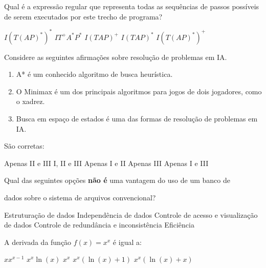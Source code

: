 \documentclass[12pt, addpoints]{exam}
\begin{document}
\begin{questions}
Qual é a expressão regular que representa todas as sequências de passos possíveis de serem executados por este trecho de programa?
\begin{choices}
\choice \( I(T(AP)^*)^* \)
\choice \( IT^+A^*P^* \)
\choice \( I(TAP)^+ \)
\choice \( I(TAP)^* \)
\choice \( I(T(AP)^*)^+ \)
\end{choices}

\question

Considere as seguintes afirmações sobre resolução de problemas em IA.

\begin{enumerate}[label=\Roman*.]

    \item A* é um conhecido algoritmo de busca heurística.

    \item O Minimax é um dos principais algoritmos para jogos de dois jogadores, como o xadrez.

    \item Busca em espaço de estados é uma das formas de resolução de problemas em IA.

\end{enumerate}

São corretas:
\begin{choices}
\choice Apenas II e III
\choice I, II e III
\choice Apenas I e II
\choice Apenas III
\choice Apenas I e III
\end{choices}

\question

Qual das seguintes opções \textbf{não é} uma vantagem do uso de um banco de

dados sobre o sistema de arquivos convencional?


\begin{choices}
\choice Estruturação de dados
\choice Independência de dados
\choice Controle de acesso e visualização de dados
\choice Controle de redundância e inconsistência
\choice Eficiência
\end{choices}

\question

A derivada da função \( f(x) = x^x \) é igual a:
\begin{choices}
\choice \( x x^{x-1} \)
\choice \( x^x \ln(x) \)
\choice \( x^x \)
\choice \( x^x (\ln(x) + 1) \)
\choice \( x^x (\ln(x) + x) \)
\end{choices}

\question


\end{questions}
\end{document}
